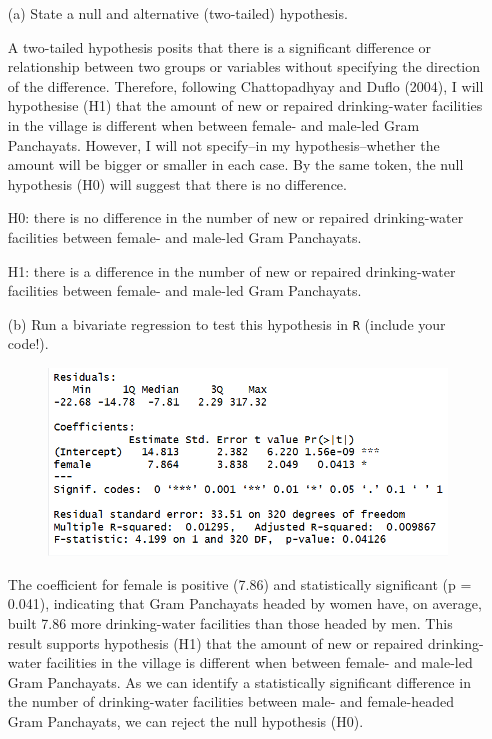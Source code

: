 \documentclass[12pt,letterpaper]{article}
\begin{document}
\newpage
\begin{enumerate}
	\item [(a)] State a null and alternative (two-tailed) hypothesis.
	\vspace{1cm}
	
	A two-tailed hypothesis posits that there is a significant difference or relationship between two groups or variables without specifying the direction of the difference. Therefore, following Chattopadhyay and Duflo (2004), I will hypothesise (H{1}) that the amount of new or repaired drinking-water facilities in the village is different when between female- and male-led Gram Panchayats. However, I will not specify--in my hypothesis--whether the amount will be bigger or smaller in each case. By the same token, the null hypothesis (H{0}) will suggest that there is no difference.
	
	\vspace{1cm}
	
	H{0}: there is no difference in the number of new or repaired drinking-water facilities between female- and male-led Gram Panchayats.
	


	H{1}: there is a difference in the number of new or repaired drinking-water facilities between female- and male-led Gram Panchayats.
	
	\vspace{2cm}
	\item [(b)] Run a bivariate regression to test this hypothesis in \texttt{R} (include your code!).
	
	 
	
	\begin{figure}[h]
		\centering
		\includegraphics[width=0.75\linewidth]{regression_output1.png}
	\end{figure}
	
	The coefficient for female is positive (7.86) and statistically significant (p = 0.041), indicating that Gram Panchayats headed by women have, on average, built 7.86 more drinking-water facilities than those headed by men. This result supports hypothesis (H{1}) that the amount of new or repaired drinking-water facilities in the village is different when between female- and male-led Gram Panchayats. As we can identify a statistically significant difference in the number of drinking-water facilities between male- and female-headed Gram Panchayats, we can reject the null hypothesis (H{0}).
	


\end{enumerate}
\end{document}
